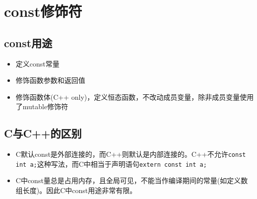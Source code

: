\section{const修饰符}
\subsection{const用途}
\begin{itemize}
    \item 定义const常量
    \item 修饰函数参数和返回值
    \item 修饰函数体(C++ only)，定义恒态函数，不改动成员变量，除非成员变量使用了mutable修饰符
\end{itemize}

\subsection{C与C++的区别}
\begin{itemize}
    \item C默认const是外部连接的，而C++则默认是内部连接的。C++不允许\verb|const int a;|这种写法，而C中相当于声明语句\verb|extern const int a;|
    \item C中const量总是占用内存，且全局可见，不能当作编译期间的常量(如定义数组长度)。因此C中const用途非常有限。
\end{itemize}



